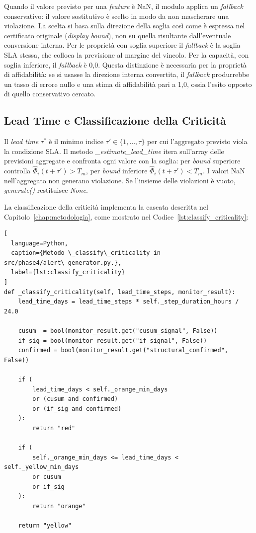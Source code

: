 Quando il valore previsto per una \textit{feature} è NaN, il modulo applica un
\textit{fallback} conservativo: il valore sostitutivo è scelto in modo da non mascherare
una violazione. La scelta si basa sulla direzione della soglia così come è espressa nel
certificato originale (\textit{display bound}), non su quella risultante dall'eventuale
conversione interna. Per le proprietà con soglia superiore il \textit{fallback} è la
soglia \gls{SLA} stessa, che colloca la previsione al margine del vincolo. Per la
capacità, con soglia inferiore, il \textit{fallback} è 0,0. Questa distinzione è
necessaria per la proprietà di affidabilità: se si usasse la direzione interna
convertita, il \textit{fallback} produrrebbe un tasso di errore nullo e una stima
di affidabilità pari a 1,0, ossia l'esito opposto di quello conservativo cercato.

\subsection{Lead Time e Classificazione della Criticità}
\label{subsec:lead_time_criticality}

Il \textit{lead time} $\tau^*$ è il minimo indice $\tau' \in \{1, \ldots, \tau\}$ per cui
l'aggregato previsto viola la condizione \gls{SLA}. Il metodo \textit{\_estimate\_lead\_time}
itera sull'array delle previsioni aggregate e confronta ogni valore con la soglia: per
\textit{bound} superiore controlla $\hat{\Phi}_i(t+\tau') > T_m$, per \textit{bound} inferiore
$\hat{\Phi}_i(t+\tau') < T_m$. I valori NaN nell'aggregato non generano violazione. Se
l'insieme delle violazioni è vuoto, \textit{generate()} restituisce \textit{None}.

La classificazione della criticità implementa la cascata descritta nel
Capitolo~\ref{chap:metodologia}, come mostrato nel Codice~\ref{lst:classify_criticality}:

\begin{lstlisting}[
  language=Python,
  caption={Metodo \_classify\_criticality in src/phase4/alert\_generator.py.},
  label={lst:classify_criticality}
]
def _classify_criticality(self, lead_time_steps, monitor_result):
    lead_time_days = lead_time_steps * self._step_duration_hours / 24.0

    cusum  = bool(monitor_result.get("cusum_signal", False))
    if_sig = bool(monitor_result.get("if_signal", False))
    confirmed = bool(monitor_result.get("structural_confirmed", False))

    if (
        lead_time_days < self._orange_min_days
        or (cusum and confirmed)
        or (if_sig and confirmed)
    ):
        return "red"

    if (
        self._orange_min_days <= lead_time_days < self._yellow_min_days
        or cusum
        or if_sig
    ):
        return "orange"

    return "yellow"
\end{lstlisting}

